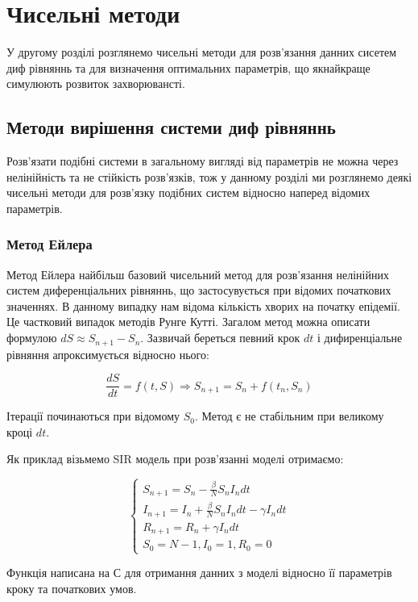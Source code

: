 
\chapter{Чисельні методи}


У другому розділі розглянемо чисельні методи для розв'язання 
данних сисетем диф рівняннь та для визначення оптимальних параметрів, що 
якнайкраще симулюють розвиток захворювансті.

\section{Методи вирішення системи диф рівняннь}


Розв'язати подібні системи в загальному вигляді від параметрів не можна 
через нелінійність та не стійкість розв'язків, тож у данному розділі ми 
розглянемо деякі чисельні методи для розв'язку подібних систем відносно 
наперед відомих параметрів. 

\subsection{Метод Ейлера}


Метод Ейлера найбільш базовий чисельний метод для розв'язання нелінійних
систем диференціальних рівняннь, що застосувується при відомих початкових
значеннях. 
В данному випадку нам відома кількість хворих на початку епідемії.
Це частковий випадок методів Рунге Кутті. 
Загалом метод можна описати формулою $dS \approx S_{n+1} - S_n$.
Зазвичай береться певний крок $dt$ і дифиренціальне рівняння 
апроксимується відносно нього:

$$\frac{dS}{dt} = f(t, S) \Rightarrow 
S_{n+1} = S_n + f(t_n, S_n)$$

Ітерації починаються при відомому $S_0$. Метод є не стабільним при великому 
кроці $dt$.

Як приклад візьмемо SIR модель при розв'язанні моделі отримаємо:

$$
\begin{cases}
    S_{n+1} = S_n - \frac{\beta}{N} S_n I_n dt \\
    I_{n+1} = I_n + \frac{\beta}{N} S_n I_n dt - \gamma I_n dt \\
    R_{n+1} = R_n + \gamma I_n dt \\
    S_0 = N - 1, I_0 = 1, R_0 = 0
\end{cases}
$$


Функція написана на С для отримання данних з моделі відносно її параметрів 
кроку та початкових умов. 



